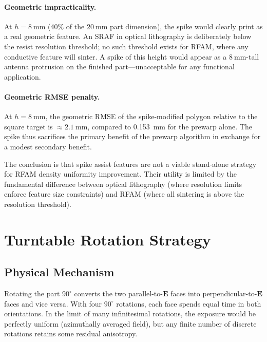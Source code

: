 \documentclass[5p,times]{elsarticle}
\newcommand{\vect}[1]{\boldsymbol{#1}}
\begin{document}
\paragraph{Geometric impracticality.}
At $h = \SI{8}{\milli\meter}$ (40\% of the $\SI{20}{\milli\meter}$ part
dimension), the spike would clearly print as a real geometric feature.
An SRAF in optical lithography is deliberately below the resist
resolution threshold; no such threshold exists for RFAM, where any
conductive feature will sinter.  A spike of this height would appear
as a $\SI{8}{\milli\meter}$-tall antenna protrusion on the finished
part---unacceptable for any functional application.

\paragraph{Geometric RMSE penalty.}
At $h = \SI{8}{\milli\meter}$, the geometric RMSE of the spike-modified
polygon relative to the square target is $\approx \SI{2.1}{\milli\meter}$,
compared to \SI{0.153}{\milli\meter} for the prewarp alone.  The spike
thus sacrifices the primary benefit of the prewarp algorithm in exchange
for a modest secondary benefit.

The conclusion is that spike assist features are not a viable
stand-alone strategy for RFAM density uniformity improvement.  Their
utility is limited by the fundamental difference between optical
lithography (where resolution limits enforce feature size constraints)
and RFAM (where all sintering is above the resolution threshold).

\FloatBarrier
\section{Turntable Rotation Strategy}
\label{sec:results_turntable}

\subsection{Physical Mechanism}

Rotating the part $90^\circ$ converts the two parallel-to-$\vect{E}$
faces into perpendicular-to-$\vect{E}$ faces and vice versa.  With
four $90^\circ$ rotations, each face spends equal time in both
orientations.  In the limit of many infinitesimal rotations, the
exposure would be perfectly uniform (azimuthally averaged field), but
any finite number of discrete rotations retains some residual anisotropy.
\end{document}
